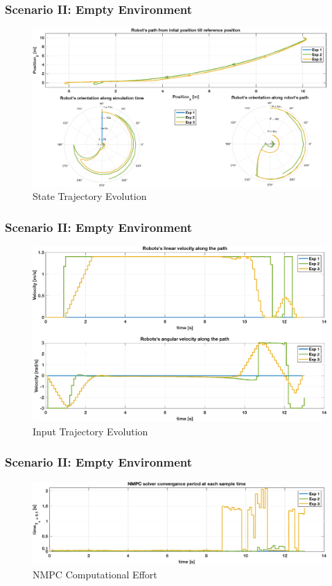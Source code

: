  	\begin{frame}
 		\frametitle{Scenario \textrm{II}: Empty Environment}
 		\begin{figure}[hbtp]
 			\centering
 			\includegraphics[scale=0.44]{pictures/graphs/sn1_states_2.eps}
 			\caption{State Trajectory Evolution}
 		\end{figure}
 	\end{frame}
 	
 	\begin{frame}
 		\frametitle{Scenario \textrm{II}: Empty Environment}
 		\begin{figure}[hbtp]
 			\centering
 			\includegraphics[scale=0.42]{pictures/graphs/sn1_inputs_2.eps}
 			\caption{Input Trajectory Evolution}
 		\end{figure}
 	\end{frame}
 	
 	\begin{frame}
 		\frametitle{Scenario \textrm{II}: Empty Environment}
 		\begin{figure}[hbtp]
 			\centering
 			\includegraphics[scale=0.42]{pictures/graphs/sn1_solver_time_2.eps}
 			\caption{NMPC Computational Effort}
 		\end{figure}
 	\end{frame}
 
